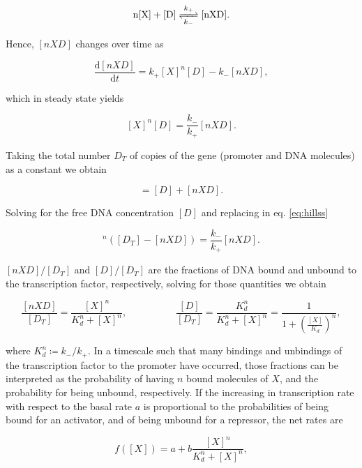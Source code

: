 \begin{equation*}
  \ce{n[X] + [D]} \ce{<=>[k_+][k_-]} \ce{[nXD]}.
\end{equation*}

Hence, $[nXD]$ changes over time as

\begin{equation*}
  \frac{\mathrm{d}[nXD]}{\mathrm{d}t} = k_+[X]^n[D] - k_-[nXD],
\end{equation*}

which in steady state yields

\begin{equation}
  \label{eq:hillss}
  [X]^n[D] = \frac{k_-}{k_+}[nXD].
\end{equation}

Taking the total number $D_T$ of copies of the gene (promoter and DNA molecules) as a constant we obtain

\begin{equation*}
  [D_T] = [D]+[nXD].
\end{equation*}

Solving for the free DNA concentration $[D]$ and replacing in eq. \eqref{eq:hillss}

\begin{equation*}
  [X]^n\left([D_T]-[nXD]\right) = \frac{k_-}{k_+}[nXD].
\end{equation*}

$[nXD]/[D_T]$ and $[D]/[D_T]$ are the fractions of DNA bound and unbound to the transcription factor, respectively, solving for those quantities we obtain

\begin{equation*}
  \frac{[nXD]}{[D_T]} = \frac{[X]^n}{K_d^n+[X]^n}, \quad\quad\quad\quad\quad  \frac{[D]}{[D_T]} = \frac{K_d^n}{K_d^n+[X]^n} = \frac{1}{1+\left(\frac{[X]}{K_d}\right)^n},
\end{equation*}

where $K_d^n \coloneqq k_-/k_+$. In a timescale such that many bindings and unbindings of the transcription factor to the promoter have occurred, those fractions can be interpreted as the probability of having $n$ bound molecules of $X$, and the probability for being unbound, respectively. If the increasing in transcription rate with respect to the basal rate $a$ is proportional to the probabilities of being bound for an activator, and of being unbound for a repressor, the net rates are

\begin{equation}
  \label{eq:con-hillac}
  f([X]) = a + b \frac{[X]^n}{K_d^n+[X]^n},
\end{equation}

